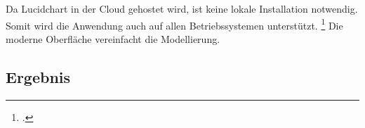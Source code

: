 \begin{figure}[H]
\begin{minipage}{\linewidth}
\begin{center}
\end{center}
\end{minipage}
\end{figure}

Da Lucidchart in der Cloud gehostet wird, ist keine lokale Installation
notwendig. Somit wird die Anwendung auch auf allen Betriebssystemen unterstützt.
\footcite{lucidchart} Die moderne Oberfläche vereinfacht die Modellierung.

\subsection{Ergebnis}

